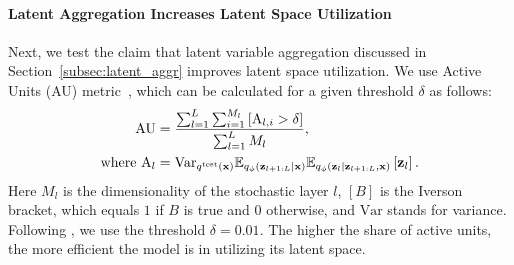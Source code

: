 \paragraph{Latent Aggregation Increases Latent Space Utilization}%

Next, we test the claim that latent variable aggregation discussed in Section~\ref{subsec:latent_aggr} improves latent space utilization. We use Active Units (AU) metric~\citep{burda2015importance}, which can be calculated for a given threshold $\delta$ as follows:
\begin{align}\label{eq:active_units}
\text{AU} &= \frac{\sum_{l=1}^L \sum_{i=1}^{M_l}  \left[\text{A}_{l, i} > \delta \right] }{\sum_{l=1}^L M_l }, \\
    \text{where } \text{A}_{l} &= \text{Var}_{q^{\text{test}}(\rvx)} \E_{q_{\phi}(\rvz_{l+1:L}|\rvx)} \E_{q_{\phi}(\rvz_l | \rvz_{l+1:L}, \rvx)}\left[\rvz_l\right].
\end{align}
Here $M_{l}$ is the dimensionality of the stochastic layer $l$, $\left[ B \right]$ is the Iverson bracket, which equals $1$ if $B$ is true and $0$ otherwise, and $\text{Var}$ stands for variance.
Following \citet{burda2015importance}, we use the threshold $\delta = 0.01$. The higher the share of active units, the more efficient the model is in utilizing its latent space. 

